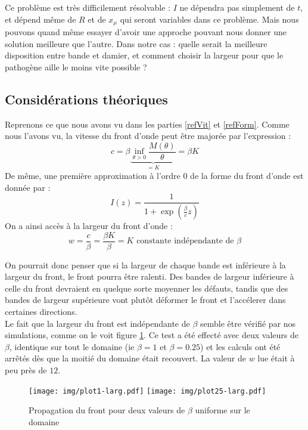 \documentclass{article}
\begin{document}
Ce problème est très difficilement résolvable : $I$ ne dépendra pas simplement de $t$, et dépend même de $R$ et de $x_{\mu}$ qui seront variables dans ce problème. Mais nous pouvons quand même essayer d'avoir une approche pouvant nous donner une solution meilleure que l'autre. Dans notre cas : quelle serait la meilleure disposition entre bande et damier, et comment choisir la largeur pour que le pathogène aille le moins vite possible ?

\subsection{Considérations théoriques}
Reprenons ce que nous avons vu dans les parties \ref{refVit} et \ref{refForm}. Comme nous l'avons vu, la vitesse du front d'onde peut être majorée par l'expression :
\begin{equation}
	c=\beta\underbrace{\inf_{\theta>0} \frac{M(\theta)}{\theta} }_{=K}= \beta K
\end{equation}
De même, une première approximation à l'ordre 0 de la forme du front d'onde est donnée par :
\begin{equation}
	I(z)=\frac{1}{1+\exp\left(\frac{\beta}{c}z\right)}
\end{equation}
On a ainsi accès à la largeur du front d'onde :
\begin{equation}
	w=\frac{c}{\beta}=\frac{\beta K}{\beta}=K \text{ constante indépendante de }\beta
\end{equation}

On pourrait donc penser que si la largeur de chaque bande est inférieure à la largeur du front, le front pourra être ralenti. Des bandes de largeur inférieure à celle du front devraient en quelque sorte moyenner les défauts, tandis que des bandes de largeur supérieure vont plutôt déformer le front et l'accélerer dans certaines directions.\\
Le fait que la largeur du front est indépendante de $\beta$ semble être vérifié par nos simulations, comme on le voit figure \ref{figLarg}. Ce test a été effecté avec deux valeurs de $\beta$, identique sur tout le domaine (ie $\beta=1$ et $\beta=0.25$) et les calculs ont été arrêtés dès que la moitié du domaine était recouvert. La valeur de $w$ lue était à peu près de $12$.

\begin{figure}[!h]
\centering
	\texttt{[image: img/plot1-larg.pdf]}
	\texttt{[image: img/plot25-larg.pdf]}
\caption{Propagation du front pour deux valeurs de $\beta$ uniforme sur le domaine}
\label{figLarg}
\end{figure}
\end{document}
